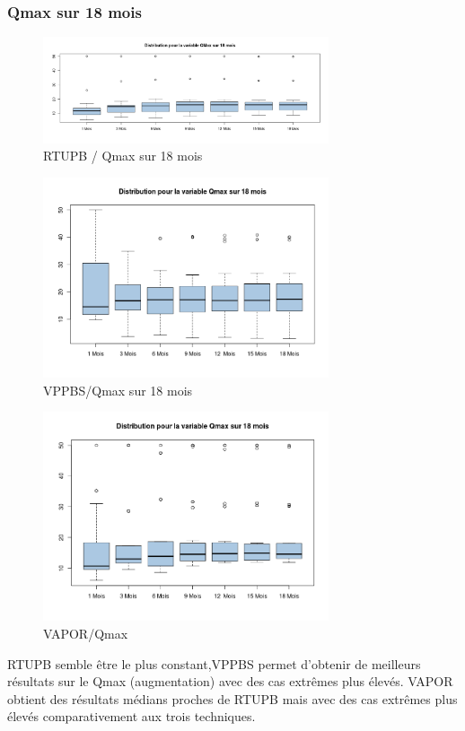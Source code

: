 %
%

\subsubsection{Qmax sur 18 mois }

\begin{figure}[H]
\centering
\includegraphics[width=0.75\textwidth]{../Fig/RTUPB/rtupb-boxplot-post-Qmax}
\caption{RTUPB / Qmax sur 18 mois}
\end{figure}	
	
\begin{figure}[H]
\centering
\includegraphics[width=0.75\textwidth]{../Fig/VPPBS/vppbs-boxplot-post-Qmax}
\caption{VPPBS/Qmax sur 18 mois}
\end{figure}


\begin{figure}[H]
\centering
\includegraphics[width=0.75\textwidth]{../Fig/VAPOR/vapor-boxplot-post-Qmax}
\caption{VAPOR/Qmax}
\end{figure}

%

 RTUPB semble être le plus constant,VPPBS permet d’obtenir de meilleurs résultats sur le Qmax (augmentation) avec des cas extrêmes plus élevés. VAPOR obtient des résultats médians proches de RTUPB mais avec des cas extrêmes plus élevés comparativement aux trois techniques.   